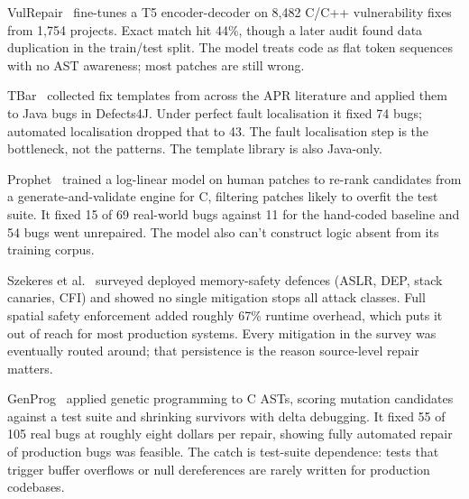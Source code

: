 VulRepair~\cite{b4} fine-tunes a T5 encoder-decoder on 8,482 C/C++ vulnerability fixes from 1,754 projects. Exact match hit 44\%, though a later audit found data duplication in the train/test split. The model treats code as flat token sequences with no AST awareness; most patches are still wrong.

TBar~\cite{b10} collected fix templates from across the APR literature and applied them to Java bugs in Defects4J. Under perfect fault localisation it fixed 74 bugs; automated localisation dropped that to 43. The fault localisation step is the bottleneck, not the patterns. The template library is also Java-only.

Prophet~\cite{b11} trained a log-linear model on human patches to re-rank candidates from a generate-and-validate engine for C, filtering patches likely to overfit the test suite. It fixed 15 of 69 real-world bugs against 11 for the hand-coded baseline and 54 bugs went unrepaired. The model also can't construct logic absent from its training corpus.

Szekeres et al.~\cite{b9} surveyed deployed memory-safety defences (ASLR, DEP, stack canaries, CFI) and showed no single mitigation stops all attack classes. Full spatial safety enforcement added roughly 67\% runtime overhead, which puts it out of reach for most production systems. Every mitigation in the survey was eventually routed around; that persistence is the reason source-level repair matters.

GenProg~\cite{b8} applied genetic programming to C ASTs, scoring mutation candidates against a test suite and shrinking survivors with delta debugging. It fixed 55 of 105 real bugs at roughly eight dollars per repair, showing fully automated repair of production bugs was feasible. The catch is test-suite dependence: tests that trigger buffer overflows or null dereferences are rarely written for production codebases.

